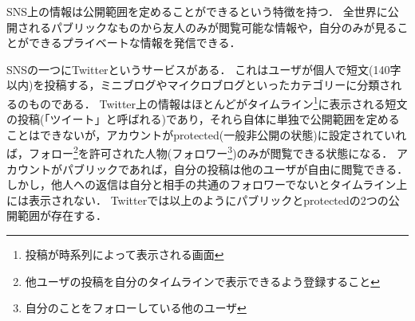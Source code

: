SNS上の情報は公開範囲を定めることができるという特徴を持つ．
全世界に公開されるパブリックなものから友人のみが閲覧可能な情報や，自分のみが見ることができるプライベートな情報を発信できる．

SNSの一つにTwitterというサービスがある．
これはユーザが個人で短文(140字以内)を投稿する，ミニブログやマイクロブログといったカテゴリーに分類されるのものである．
Twitter上の情報はほとんどがタイムライン\footnote{投稿が時系列によって表示される画面}に表示される短文の投稿(「ツイート」と呼ばれる)であり，それら自体に単独で公開範囲を定めることはできないが，アカウントがprotected(一般非公開の状態)に設定されていれば，フォロー\footnote{他ユーザの投稿を自分のタイムラインで表示できるよう登録すること}を許可された人物(フォロワー\footnote{自分のことをフォローしている他のユーザ})のみが閲覧できる状態になる．
アカウントがパブリックであれば，自分の投稿は他のユーザが自由に閲覧できる．しかし，他人への返信は自分と相手の共通のフォロワーでないとタイムライン上には表示されない．
Twitterでは以上のようにパブリックとprotectedの2つの公開範囲が存在する．
\newpage
